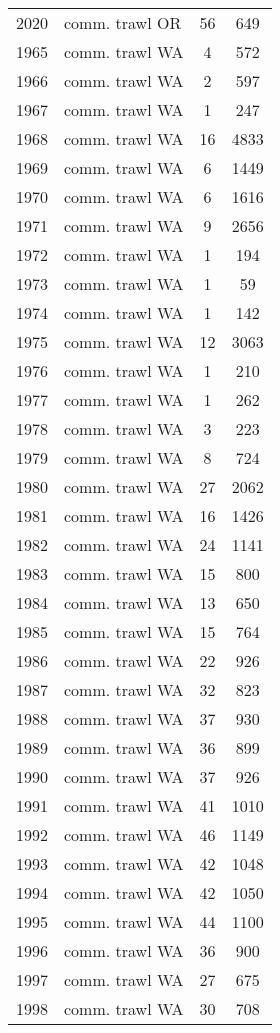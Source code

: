 \begin{longtable}[t]{c>{\centering\arraybackslash}p{4cm}cc}
2020 & comm. trawl OR & 56 & 649\\
1965 & comm. trawl WA & 4 & 572\\
1966 & comm. trawl WA & 2 & 597\\
1967 & comm. trawl WA & 1 & 247\\
1968 & comm. trawl WA & 16 & 4833\\
1969 & comm. trawl WA & 6 & 1449\\
1970 & comm. trawl WA & 6 & 1616\\
1971 & comm. trawl WA & 9 & 2656\\
1972 & comm. trawl WA & 1 & 194\\
1973 & comm. trawl WA & 1 & 59\\
1974 & comm. trawl WA & 1 & 142\\
1975 & comm. trawl WA & 12 & 3063\\
1976 & comm. trawl WA & 1 & 210\\
1977 & comm. trawl WA & 1 & 262\\
1978 & comm. trawl WA & 3 & 223\\
1979 & comm. trawl WA & 8 & 724\\
1980 & comm. trawl WA & 27 & 2062\\
1981 & comm. trawl WA & 16 & 1426\\
1982 & comm. trawl WA & 24 & 1141\\
1983 & comm. trawl WA & 15 & 800\\
1984 & comm. trawl WA & 13 & 650\\
1985 & comm. trawl WA & 15 & 764\\
1986 & comm. trawl WA & 22 & 926\\
1987 & comm. trawl WA & 32 & 823\\
1988 & comm. trawl WA & 37 & 930\\
1989 & comm. trawl WA & 36 & 899\\
1990 & comm. trawl WA & 37 & 926\\
1991 & comm. trawl WA & 41 & 1010\\
1992 & comm. trawl WA & 46 & 1149\\
1993 & comm. trawl WA & 42 & 1048\\
1994 & comm. trawl WA & 42 & 1050\\
1995 & comm. trawl WA & 44 & 1100\\
1996 & comm. trawl WA & 36 & 900\\
1997 & comm. trawl WA & 27 & 675\\
1998 & comm. trawl WA & 30 & 708\\

\end{longtable}

